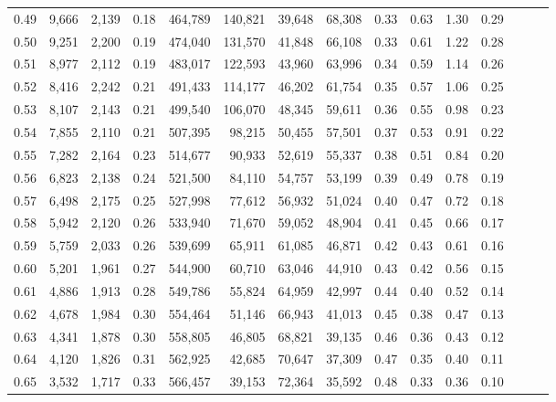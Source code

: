 \begin{tabular}{rrrrrrrrrrrrrrr}
0.49 &   9,666 &  2,139 &  0.18 &  464,789 &  140,821 &   39,648 &   68,308 &  0.33 &  0.63 &  1.30 &      0.29 \\
0.50 &   9,251 &  2,200 &  0.19 &  474,040 &  131,570 &   41,848 &   66,108 &  0.33 &  0.61 &  1.22 &      0.28 \\
0.51 &   8,977 &  2,112 &  0.19 &  483,017 &  122,593 &   43,960 &   63,996 &  0.34 &  0.59 &  1.14 &      0.26 \\
0.52 &   8,416 &  2,242 &  0.21 &  491,433 &  114,177 &   46,202 &   61,754 &  0.35 &  0.57 &  1.06 &      0.25 \\
0.53 &   8,107 &  2,143 &  0.21 &  499,540 &  106,070 &   48,345 &   59,611 &  0.36 &  0.55 &  0.98 &      0.23 \\
0.54 &   7,855 &  2,110 &  0.21 &  507,395 &   98,215 &   50,455 &   57,501 &  0.37 &  0.53 &  0.91 &      0.22 \\
0.55 &   7,282 &  2,164 &  0.23 &  514,677 &   90,933 &   52,619 &   55,337 &  0.38 &  0.51 &  0.84 &      0.20 \\
0.56 &   6,823 &  2,138 &  0.24 &  521,500 &   84,110 &   54,757 &   53,199 &  0.39 &  0.49 &  0.78 &      0.19 \\
0.57 &   6,498 &  2,175 &  0.25 &  527,998 &   77,612 &   56,932 &   51,024 &  0.40 &  0.47 &  0.72 &      0.18 \\
0.58 &   5,942 &  2,120 &  0.26 &  533,940 &   71,670 &   59,052 &   48,904 &  0.41 &  0.45 &  0.66 &      0.17 \\
0.59 &   5,759 &  2,033 &  0.26 &  539,699 &   65,911 &   61,085 &   46,871 &  0.42 &  0.43 &  0.61 &      0.16 \\
0.60 &   5,201 &  1,961 &  0.27 &  544,900 &   60,710 &   63,046 &   44,910 &  0.43 &  0.42 &  0.56 &      0.15 \\
0.61 &   4,886 &  1,913 &  0.28 &  549,786 &   55,824 &   64,959 &   42,997 &  0.44 &  0.40 &  0.52 &      0.14 \\
0.62 &   4,678 &  1,984 &  0.30 &  554,464 &   51,146 &   66,943 &   41,013 &  0.45 &  0.38 &  0.47 &      0.13 \\
0.63 &   4,341 &  1,878 &  0.30 &  558,805 &   46,805 &   68,821 &   39,135 &  0.46 &  0.36 &  0.43 &      0.12 \\
0.64 &   4,120 &  1,826 &  0.31 &  562,925 &   42,685 &   70,647 &   37,309 &  0.47 &  0.35 &  0.40 &      0.11 \\
0.65 &   3,532 &  1,717 &  0.33 &  566,457 &   39,153 &   72,364 &   35,592 &  0.48 &  0.33 &  0.36 &      0.10 \\

\end{tabular}
